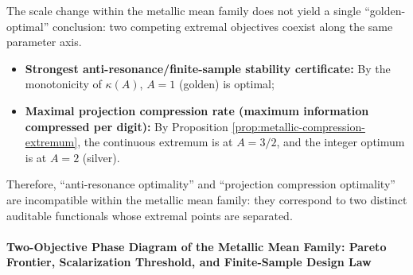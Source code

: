\begin{remark}\label{rem:metallic-dual-optimality}
The scale change within the metallic mean family does not yield a single ``golden-optimal'' conclusion: two competing extremal objectives coexist along the same parameter axis.
\begin{itemize}
  \item \textbf{Strongest anti-resonance/finite-sample stability certificate:} By the monotonicity of $\kappa(A)$, $A=1$ (golden) is optimal;
  \item \textbf{Maximal projection compression rate (maximum information compressed per digit):} By Proposition \ref{prop:metallic-compression-extremum}, the continuous extremum is at $A=3/2$, and the integer optimum is at $A=2$ (silver).
\end{itemize}
Therefore, ``anti-resonance optimality'' and ``projection compression optimality'' are incompatible within the metallic mean family: they correspond to two distinct auditable functionals whose extremal points are separated.
\end{remark}

\paragraph{Two-Objective Phase Diagram of the Metallic Mean Family: Pareto Frontier, Scalarization Threshold, and Finite-Sample Design Law}

